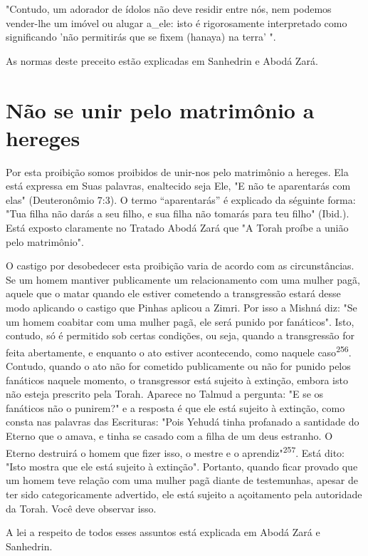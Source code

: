 "Contudo, um adorador de ídolos não deve residir entre nós, nem podemos
vender-lhe um imóvel ou alugar a\_ele: isto é rigorosamente
interpre­tado como significando 'não permitirás que se fixem (hanaya) na
terra' ".



As normas deste preceito estão explicadas em Sanhedrin e Abodá Zará.


\section{Não se unir pelo matrimônio a hereges}

Por esta proibição somos proibidos de unir-nos pelo matrimônio a
hereges. Ela está expressa em Suas palavras, enaltecido seja Ele, "E não
te apa­rentarás com elas" (Deuteronômio 7:3). O termo ``aparentarás'' é
explicado da séguinte forma: "Tua filha não darás a seu filho, e sua
filha não tomarás para teu filho" (Ibid.). Está exposto claramente no
Tratado Abodá Zará que "A To­rah proíbe a união pelo matrimônio".

O castigo por desobedecer esta proibição varia de acordo com as
circunstâncias. Se um homem mantiver publicamente um relacionamento com
uma mulher pagã, aquele que o matar quando ele estiver cometendo a
trans­gressão estará desse modo aplicando o castigo que Pinhas aplicou a
Zimri. Por isso a Mishná diz: "Se um homem coabitar com uma mulher pagã,
ele será pu­nido por fanáticos". Isto, contudo, só é permitido sob
certas condições, ou se­ja, quando a transgressão for feita abertamente,
e enquanto o ato estiver acon­tecendo, como naquele
caso\textsuperscript{256}. Contudo, quando o ato não for cometido
pu­blicamente ou não for punido pelos fanáticos naquele momento, o
transgres­sor está sujeito à extinção, embora isto não esteja prescrito
pela Torah. Apare­ce no Talmud a pergunta: "E se os fanáticos não o
punirem?" e a resposta é que ele está sujeito à extinção, como consta
nas palavras das Escrituras: "Pois Yehudá tinha profanado a santidade do
Eterno que o amava, e tinha se casado com a filha de um deus estranho. O
Eterno destruirá o homem que fizer isso, o mestre e o
aprendiz"\textsuperscript{257}. Está dito: "Isto mostra que ele está
sujeito à extin­ção". Portanto, quando ficar provado que um homem teve
relação com uma mulher pagã diante de testemunhas, apesar de ter sido
categoricamente adver­tido, ele está sujeito a açoitamento pela
autoridade da Torah. Você deve obser­var isso.

A lei a respeito de todos esses assuntos está explicada em Abodá Za­rá e
Sanhedrin.


